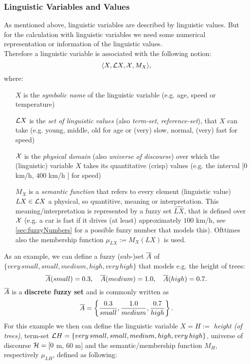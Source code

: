 \subsubsection{Linguistic Variables and Values} \label{sec:linguicVar}
As mentioned above, linguistic variables are described by linguistic values. But for the calculation with linguistic variables we need some numerical representation or information of the linguistic values.\\
Therefore a linguistic variable is associated with the following notion:
\[ \langle X,\mathcal{L}X, \mathcal{X}, M_X \rangle, \]
where:
\begin{itemize}
\item[$X$] is the \emph{symbolic name} of the linguistic variable (e.g. age, speed or temperature)
\item[$\mathcal{L}X$] is the \emph{set of linguistic values} (also \emph{term-set}, \emph{reference-set}), that $X$ can take (e.g. young, middle, old for age or (very) slow, normal, (very) fast for speed)
\item[$\mathcal{X}$] is the \emph{physical domain} (also \emph{universe of discourse}) over which the (linguistic) variable $X$ takes its quantitative (crisp) values (e.g. the interval $[0$ km/h, $400$ km/h $]$ for speed)
\item[$M_X$] is a \emph{semantic function} that refers to every element (linguistic value) $LX\in\mathcal{L}X$ a physical, so quantitive, meaning or interpretation. This meaning/interpretation is represented by a fuzzy set $\widehat{LX}$, that is defined over $\mathcal{X}$ (e.g. a car is fast if it drives (at least) approximately $100$ km/h, see \ref{sec:fuzzyNumbers} for a possible fuzzy number that models this). Ofttimes also the membership function $\mu_{LX}:=M_X(LX)$ is used.
\end{itemize}
As an example, we can define a fuzzy (sub-)set $\overline{A}$ of $\{ very\, small, small, medium, high, very\, high \}$ that models e.g. the height of trees:
\[ \overline{A}(small)=0.3,\quad \overline{A}(medium)=1.0, \quad \overline{A}(high)=0.7. \]
$\overline{A}$ is a \textbf{discrete fuzzy set} and is commonly written as
\[ \overline{A} = \left\{ \frac{0.3}{small}, \frac{1.0}{medium}, \frac{0.7}{high} \right\}. \]
For this example we then can define the linguistic variable $X=H:=$ \textit{height (of trees)}, term-set $\mathcal{L}H=\{ very\, small, small, medium, high, very\, high \}$, universe of discourse $\mathcal{H}=[0$ m, $60$ m$]$ and the semantic/membership function $M_H$, respectively $\mu_{LH}$, defined as following:
